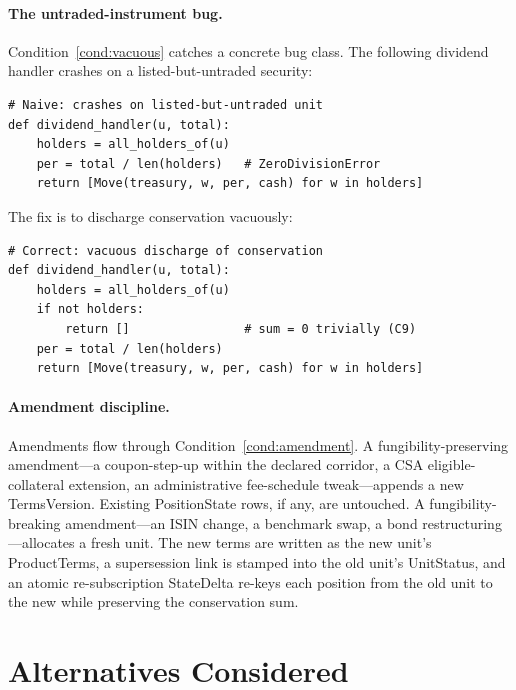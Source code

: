 \documentclass[11pt,a4paper]{article}
\begin{document}
\paragraph{The untraded-instrument bug.} Condition~\ref{cond:vacuous} catches a concrete bug class. The following dividend handler crashes on a listed-but-untraded security:

\begin{lstlisting}[language=pythonstyle]
# Naive: crashes on listed-but-untraded unit
def dividend_handler(u, total):
    holders = all_holders_of(u)
    per = total / len(holders)   # ZeroDivisionError
    return [Move(treasury, w, per, cash) for w in holders]
\end{lstlisting}

\noindent The fix is to discharge conservation vacuously:

\begin{lstlisting}[language=pythonstyle]
# Correct: vacuous discharge of conservation
def dividend_handler(u, total):
    holders = all_holders_of(u)
    if not holders:
        return []                # sum = 0 trivially (C9)
    per = total / len(holders)
    return [Move(treasury, w, per, cash) for w in holders]
\end{lstlisting}

\paragraph{Amendment discipline.} Amendments flow through Condition~\ref{cond:amendment}. A fungibility-preserving amendment---a coupon-step-up within the declared corridor, a CSA eligible-collateral extension, an administrative fee-schedule tweak---appends a new TermsVersion. Existing PositionState rows, if any, are untouched. A fungibility-breaking amendment---an ISIN change, a benchmark swap, a bond restructuring---allocates a fresh unit. The new terms are written as the new unit's ProductTerms, a supersession link is stamped into the old unit's UnitStatus, and an atomic re-subscription StateDelta re-keys each position from the old unit to the new while preserving the conservation sum.

\clearpage
\section{Alternatives Considered}
\label{sec:alternatives}
\end{document}
